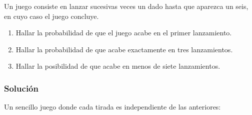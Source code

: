 \documentclass[12pt,a4paper]{article}
\begin{document}
Un juego consiste en lanzar sucesivas veces un dado hasta que aparezca un seis, en cuyo caso el juego concluye.
\begin{enumerate}
  \item[a)] Hallar la probabilidad de que el juego acabe en el primer lanzamiento.
  \item[b)] Hallar la probabilidad de que acabe exactamente en tres lanzamientos.
  \item[c)] Hallar la posibilidad de que acabe en menos de siete lanzamientos.
\end{enumerate}

\subsubsection{Solución}

Un sencillo juego donde cada tirada es independiente de las anteriores:
\end{document}

